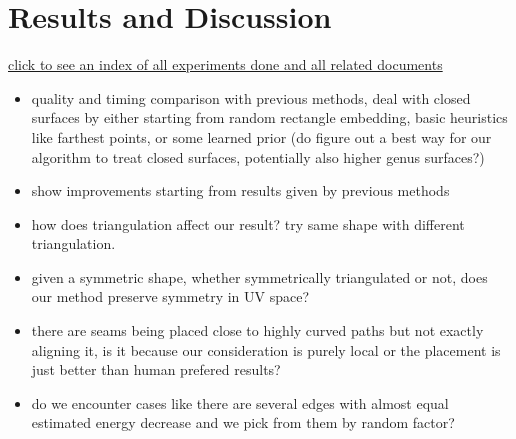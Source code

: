 \section{Results and Discussion}

\href{http://www.cs.ubc.ca/labs/imager/dgp/FracCuts/expResults/}{click to see an index of all experiments done and all related documents}


\begin{itemize}
\item quality and timing comparison with previous methods, deal with closed surfaces by either starting from random rectangle embedding, basic heuristics like farthest points, or some learned prior (do figure out a best way for our algorithm to treat closed surfaces, potentially also higher genus surfaces?)
\item show improvements starting from results given by previous methods
\item how does triangulation affect our result? try same shape with different triangulation.
\item given a symmetric shape, whether symmetrically triangulated or not, does our method preserve symmetry in UV space?
\item there are seams being placed close to highly curved paths but not exactly aligning it, is it because our consideration is purely local or the placement is just better than human prefered results?
\item do we encounter cases like there are several edges with almost equal estimated energy decrease and we pick from them by random factor?
\end{itemize}